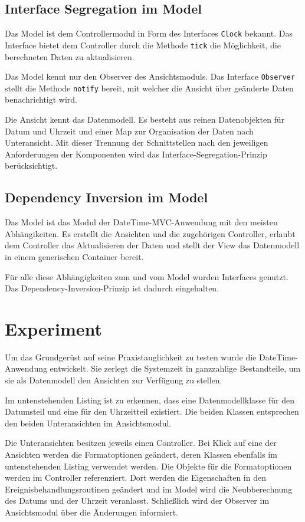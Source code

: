 \documentclass{vldb}
\begin{document}
\subsection{Interface Segregation im Model}
Das Model ist dem Controllermodul in Form des Interfaces \texttt{Clock} bekannt. Das Interface bietet dem Controller durch die Methode \texttt{tick} die Möglichkeit, die berechneten Daten zu aktualisieren.

Das Model kennt nur den Observer des Ansichtsmoduls. Das Interface \texttt{Observer} stellt die Methode \texttt{notify} bereit, mit welcher die Ansicht über geänderte Daten benachrichtigt wird.

Die Ansicht kennt das Datenmodell. Es besteht aus reinen Datenobjekten für Datum und Uhrzeit und einer Map zur Organisation der Daten nach Unteransicht. Mit dieser Trennung der Schnittstellen nach den jeweiligen Anforderungen der Komponenten wird das Interface-Segregation-Prinzip be\-rück\-sich\-tigt.

\subsection{Dependency Inversion im Model}
Das Model ist das Modul der DateTime-MVC-Anwendung mit den meisten Abhängikeiten. Es erstellt die Ansichten und die zugehörigen Controller, erlaubt dem Controller das Aktualisieren der Daten und stellt der View das Datenmodell in einem generischen Container bereit.

Für alle diese Abhängigkeiten zum und vom Model wurden Interfaces genutzt. Das Dependency-Inversion-Prinzip ist dadurch eingehalten.

\section{Experiment}
Um das Grundgerüst auf seine Praxistauglichkeit zu testen wurde die DateTime-Anwendung entwickelt. Sie zerlegt die Systemzeit in ganzzahlige Bestandteile, um sie als Datenmodell den Ansichten zur Verfügung zu stellen.

Im untenstehenden Listing ist zu erkennen, dass eine Datenmodellklasse für den Datumsteil und eine für den Uhrzeitteil existiert. Die beiden Klassen entsprechen den beiden Unteransichten im Ansichtsmodul.

Die Unteransichten besitzen jeweils einen Controller. Bei Klick auf eine der Ansichten werden die Formatoptionen geändert, deren Klassen ebenfalls im untenstehenden Listing verwendet werden. Die Objekte für die Formatoptionen werden im Controller referenziert. Dort werden die Eigenschaften in den Ereignisbehandlungsroutinen geändert und im Model wird die Neubberechnung des Datums und der Uhrzeit veranlasst. Schließlich wird der Observer im Ansichtsmodul über die Änderungen informiert.
\end{document}
